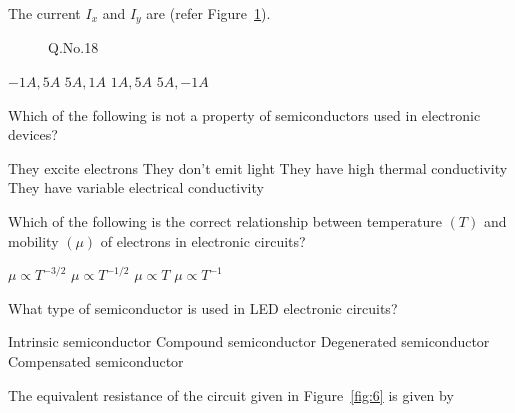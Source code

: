 \documentclass[a4, 12pt, addpoints]{exam}
\begin{document}
\begin{questions}
\begin{oneparchoices}
\end{oneparchoices}
\question The current $I_x$ and $I_y$ are (refer Figure~\ref{fig:3}).
\begin{figure}[H]
\centering
{}
\caption{Q.No.18}
\label{fig:3}
\end{figure}
\begin{oneparchoices}
    \choice $-1A, 5A$
    \choice $ 5A, 1A$
    \choice $1A, 5A$
    \CorrectChoice $5A, -1A$
\end{oneparchoices}    
\question  Which of the following is not a property of semiconductors used in electronic devices?\\[0.3cm]
\begin{oneparchoices}
\choice They excite electrons
\choice They don't emit light
\choice They have high thermal conductivity
\choice They have variable electrical conductivity  
\end{oneparchoices}  
\question Which of the following is the correct relationship between temperature $(T)$ and mobility $(\mu)$ of electrons in electronic circuits?\\[0.3cm]
\begin{oneparchoices}
\choice $\mu \propto T^{-3/2} $
\choice $ \mu \propto T^{-1/2} $
\choice $ \mu \propto T $
\choice $ \mu \propto T^{-1} $  
\end{oneparchoices}  
\question What type of semiconductor is used in LED electronic circuits?\\[0.3cm]
\begin{oneparchoices}
\choice Intrinsic semiconductor
\choice Compound semiconductor
\choice Degenerated semiconductor
\choice Compensated semiconductor
\end{oneparchoices}
\question  The equivalent resistance of the circuit given in Figure~\ref{fig:6} is given by
\begin{figure}[H]
\centering
{}
\end{figure}
\end{questions}
\end{document}
